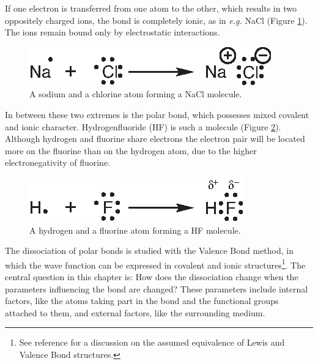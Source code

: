 If one electron is transferred from one atom to the other, which results in two oppositely charged ions, the bond is completely ionic, as in \textit{e.g.} NaCl (Figure \ref{ch3.fig.nacl}). The ions remain bound only by electrostatic interactions. 
\begin{figure}[ht]
\center
\includegraphics{dissociation/figures/nacl.eps}
\caption{A sodium and a chlorine atom forming a NaCl molecule.}
\label{ch3.fig.nacl}
\end{figure}

In between these two extremes is the polar bond, which possesses mixed covalent and ionic character. Hydrogenfluoride (HF) is such a molecule (Figure \ref{ch3.fig.hf}). Although hydrogen and fluorine share electrons the electron pair will be located more on the fluorine than on the hydrogen atom, due to the higher electronegativity of fluorine.
\begin{figure}[ht]
\center
\includegraphics{dissociation/figures/hf.eps}
\caption{A hydrogen and a fluorine atom forming a HF molecule.}
\label{ch3.fig.hf}
\end{figure}

The dissociation of polar bonds is studied with the Valence Bond method, in which the wave function can be expressed in covalent and ionic structures\footnote{See reference \cite{interpret} for a discussion on the assumed equivalence of Lewis and Valence Bond structures.}. The central question in this chapter is: How does the dissociation change when the parameters influencing the bond are changed? These parameters include internal factors, like the atoms taking part in the bond and the functional groups attached to them, and external factors, like the surrounding medium. 

